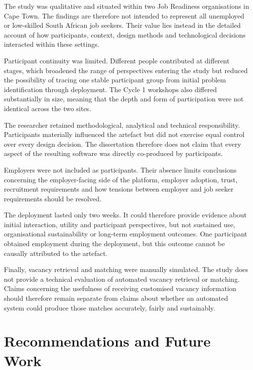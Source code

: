 The study was qualitative and situated within two Job Readiness organisations in Cape Town. The findings are therefore not intended to represent all unemployed or low-skilled South African job seekers. Their value lies instead in the detailed account of how participants, context, design methods and technological decisions interacted within these settings.

Participant continuity was limited. Different people contributed at different stages, which broadened the range of perspectives entering the study but reduced the possibility of tracing one stable participant group from initial problem identification through deployment. The Cycle 1 workshops also differed substantially in size, meaning that the depth and form of participation were not identical across the two sites.

The researcher retained methodological, analytical and technical responsibility. Participants materially influenced the artefact but did not exercise equal control over every design decision. The dissertation therefore does not claim that every aspect of the resulting software was directly co-produced by participants.

Employers were not included as participants. Their absence limits conclusions concerning the employer-facing side of the platform, employer adoption, trust, recruitment requirements and how tensions between employer and job seeker requirements should be resolved.

The deployment lasted only two weeks. It could therefore provide evidence about initial interaction, utility and participant perspectives, but not sustained use, organisational sustainability or long-term employment outcomes. One participant obtained employment during the deployment, but this outcome cannot be causally attributed to the artefact.

Finally, vacancy retrieval and matching were manually simulated. The study does not provide a technical evaluation of automated vacancy retrieval or matching. Claims concerning the usefulness of receiving customised vacancy information should therefore remain separate from claims about whether an automated system could produce those matches accurately, fairly and sustainably.


\section{Recommendations and Future Work}

